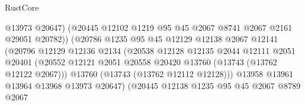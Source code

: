 \begin{lexlean}{RustCore}
\begin{coremodule}
                                        @13973
                                        @20647)
                                      (@20445
                                        @12102
                                        @1219
                                        @95
                                        @45
                                        @2067
                                        @8741
                                        @2067
                                        @2161
                                        @29051
                                        @20782))
                                    (@20786
                                      @1235
                                      @95
                                      @45
                                      @12129
                                      @12138
                                      @2067
                                      @12141
                                      (@20796
                                        @12129
                                        @12136
                                        @2134
                                        (@20538
                                          @12128
                                          @12135
                                          @2044
                                          @12111
                                          @2051
                                          @20401
                                          (@20552
                                            @12121
                                            @2051
                                            @20558
                                            @20420
                                            @13760
                                            (@13743 (@13762 @12122 @2067)))
                                          @13760
                                          (@13743 (@13762 @12112 @12128)))
                                        @13958
                                        @13961
                                        @13964
                                        @13968
                                        @13973
                                        @20647)
                                      (@20445
                                        @12138
                                        @1235
                                        @95
                                        @45
                                        @2067
                                        @8789
                                        @2067

\end{coremodule}
\end{lexlean}
